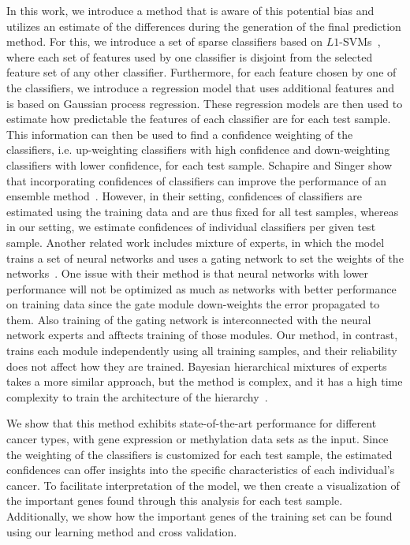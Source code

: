 In this work, we introduce a method that is aware of this potential bias and utilizes an estimate of the differences during the generation of the final prediction method. For this, we introduce a set of sparse classifiers based on $L1$-SVMs~\cite{bradley1998feature}, where each set of features used by one classifier is disjoint from the selected feature set of any other classifier. Furthermore, for each feature chosen by one of the classifiers, we introduce a regression model that uses additional features and is based on Gaussian process regression. These regression models are then used to estimate how predictable the features of each classifier are for each test sample. This information can then be used to find a confidence weighting of the classifiers, i.e. up-weighting classifiers with high confidence and down-weighting classifiers with lower confidence, for each test sample. Schapire and Singer show that incorporating confidences of classifiers can improve the performance of an ensemble method~\cite{adaboost99improved}. However, in their setting, confidences of classifiers are estimated using the training data and are thus fixed for all test samples, whereas in our setting, we estimate confidences of individual classifiers per given test sample. Another related work includes mixture of experts, in which the model trains a set of neural networks and uses a gating network to set the weights of the networks~\cite{jacobs1991adaptive}. One issue with their method is that neural networks with lower performance will not be optimized as much as networks with better performance on training data since the gate module down-weights the error propagated to them. Also training of the gating network is interconnected with the neural network experts and afftects training of those modules. Our method, in contrast, trains each module independently using all training samples, and their reliability does not affect how they are trained. Bayesian hierarchical mixtures of experts takes a more similar approach, but the method is complex, and it has a high time complexity to train the architecture of the hierarchy~\cite{bishop2002bayesian}.

We show that this method exhibits state-of-the-art performance for different cancer types, with gene expression or methylation data sets as the input. Since the weighting of the classifiers is customized for each test sample, the estimated confidences can offer insights into the specific characteristics of each individual's cancer. To facilitate interpretation of the model, we then create a visualization of the important genes found through this analysis for each test sample. Additionally, we show how the important genes of the training set can be found using our learning method and cross validation.

